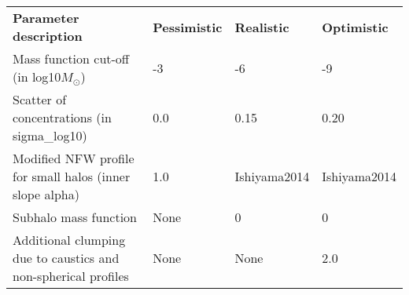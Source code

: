 \begin{table}
    \begin{tabular}{llll}
    \textbf{Parameter \newline description}                                    & \textbf{Pessimistic} & \textbf{Realistic} & \textbf{Optimistic} \hline \hline \\
    Mass function cut-off (in log10$M_\odot$)        & -3 & -6 & -9 \\
    Scatter of concentrations (in sigma\_log10)              & 0.0 & 0.15 & 0.20 \\
    Modified NFW profile for small halos (inner slope alpha) & 1.0 & Ishiyama2014 & Ishiyama2014 \\
    Subhalo mass function & None & 0 & 0 \\
    Additional clumping due to caustics and non-spherical profiles & None & None & 2.0
\\    \end{tabular}
\end{table}